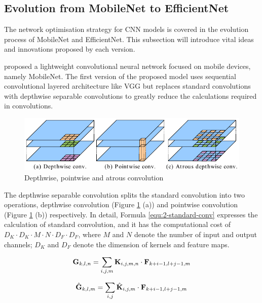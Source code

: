 \subsection{Evolution from MobileNet to EfficientNet}
\label{subsec:Evolution from MobileNet to EfficientNet}
The network optimisation strategy for CNN models is covered in the evolution process of MobileNet and EfficientNet. This subsection will introduce vital ideas and innovations proposed by each version.

\citet{howard2017mobilenets} proposed a lightweight convolutional neural network focused on mobile devices, namely MobileNet.
The first version of the proposed model uses sequential convolutional layered architecture like VGG but replaces standard convolutions with depthwise separable convolutions to greatly reduce the calculations required in convolutions.

\begin{figure}[!ht]
    \centering
    \includegraphics[width=.8\textwidth]{literature/imgs/ext-2-mobile-depth-point-atrous.pdf}
    \caption{Depthwise, pointwise and atrous convolution \cite{chen2018encoder}}
    \label{fig:ext-2-mobile-depth-point-atrous}
\end{figure}

The depthwise separable convolution splits the standard convolution into two operations, depthwise convolution (Figure \ref{fig:ext-2-mobile-depth-point-atrous} (a)) and pointwise convolution (Figure \ref{fig:ext-2-mobile-depth-point-atrous} (b)) respectively.
In detail, Formula \ref{equ:2-standard-conv} expresses the calculation of standard convolution, and it has the computational cost of $D_K \cdot D_K \cdot M \cdot N \cdot D_F \cdot D_F$, where $M$ and $N$ denote the number of input and output channels; $D_K$ and $D_F$ denote the dimension of kernels and feature maps.

\begin{minipage}[!ht]{.48\textwidth}
\begin{equation}
    \mathbf{G}_{k, l, n}=\sum_{i, j, m} \mathbf{K}_{i, j, m, n} \cdot \mathbf{F}_{k+i-1, l+j-1, m}
    \eqcite{howard2017mobilenets}
    \label{equ:2-standard-conv}
\end{equation}
\end{minipage}
\begin{minipage}[!ht]{.48\textwidth}
\begin{equation}
    \hat{\mathbf{G}}_{k, l, m}=\sum_{i, j} \hat{\mathbf{K}}_{i, j, m} \cdot \mathbf{F}_{k+i-1, l+j-1, m}
    \eqcite{howard2017mobilenets}
    \label{equ:2-depthwise-conv}
\end{equation}
\end{minipage}

